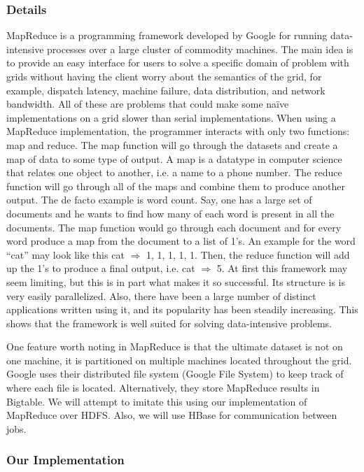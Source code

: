 \documentclass[conference,final]{IEEEtran}
\begin{document}
\subsubsection{Details}

MapReduce is a programming framework developed by Google for running
data-intensive processes over a large cluster of commodity machines.
The main idea is to provide an easy interface for users to solve a
specific domain of problem with grids without having the client worry 
about the semantics of the grid, for example, dispatch latency, machine
failure, data distribution, and network bandwidth.  All of these are
problems that could make some naïve implementations on a grid slower
than serial implementations.  When using a MapReduce implementation,
the programmer interacts with only two functions: map and reduce.  
The map function will go through the datasets and create a map of data
to some type of output.  A map is a datatype in computer science that
relates one object to another, i.e. a name to a phone number.  The reduce
function will go through all of the maps and combine them to produce
another output.  The de facto example is word count.  Say, one has a
large set of documents and he wants to find how many of each word is
present in all the documents.  The map function would go through each
document and for every word produce a map from the document to a list
of 1’s.  An example for the word “cat” may look like this cat $\Rightarrow$ 1, 1,
1, 1, 1.  Then, the reduce function will add up the 1’s to produce a
final output, i.e. cat $\Rightarrow$ 5.  At first this framework may seem limiting,
but this is in part what makes it so successful.  Its structure is 
is very easily parallelized.   Also, there have been a large number
of distinct applications written using it, and its popularity has been
steadily increasing.  This shows that the framework is well suited for
solving data-intensive problems.

One feature worth noting in MapReduce is that the ultimate dataset is not 
on one machine, it is partitioned on multiple machines located throughout the 
grid. Google uses their distributed file system (Google File System) to keep 
track of where each file is located.  Alternatively, they store MapReduce 
results in Bigtable.  We will attempt to imitate this using our implementation
of MapReduce over HDFS.  Also, we will use HBase for communication between jobs.

\subsubsection{Our Implementation} 
\end{document}
